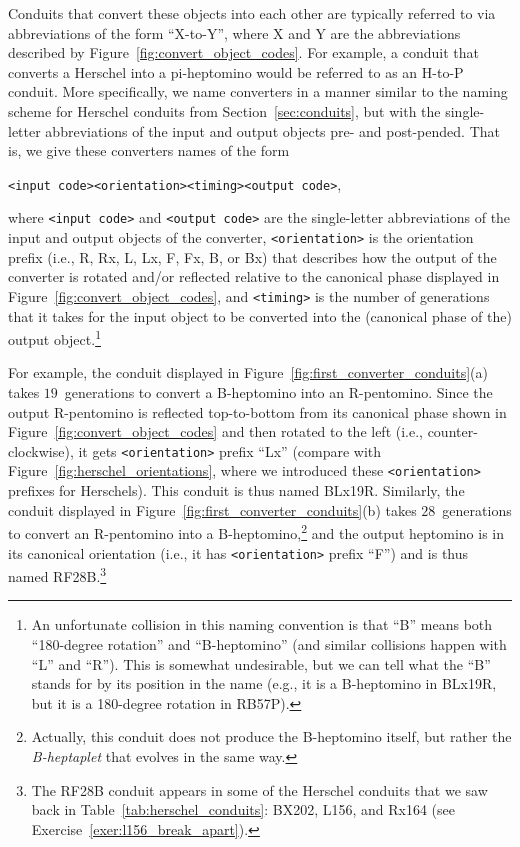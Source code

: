 Conduits that convert these objects into each other are typically referred to via abbreviations of the form ``X-to-Y'', where X and Y are the abbreviations described by Figure~\ref{fig:convert_object_codes}. For example, a conduit that converts a Herschel into a pi-heptomino would be referred to as an H-to-P conduit. More specifically, we name converters in a manner similar to the naming scheme for Herschel conduits from Section~\ref{sec:conduits}, but with the single-letter abbreviations of the input and output objects pre- and post-pended. That is, we give these converters names of the form
\begin{center}
	\verb|<input code><orientation><timing><output code>|,
\end{center}
\noindent where \verb|<input code>| and \verb|<output code>| are the single-letter abbreviations of the input and output objects of the converter, \verb|<orientation>| is the orientation prefix (i.e., R, Rx, L, Lx, F, Fx, B, or Bx) that describes how the output of the converter is rotated and/or reflected relative to the canonical phase displayed in Figure~\ref{fig:convert_object_codes}, and \verb|<timing>| is the number of generations that it takes for the input object to be converted into the (canonical phase of the) output object.\footnote{An unfortunate collision in this naming convention is that ``B'' means both ``180-degree rotation'' and ``B-heptomino'' (and similar collisions happen with ``L'' and ``R''). This is somewhat undesirable, but we can tell what the ``B'' stands for by its position in the name (e.g., it is a B-heptomino in BLx19R, but it is a 180-degree rotation in RB57P).}

For example, the conduit displayed in Figure~\ref{fig:first_converter_conduits}(a) takes $19$~generations to convert a B-heptomino into an R-pentomino. Since the output R-pentomino is reflected top-to-bottom from its canonical phase shown in Figure~\ref{fig:convert_object_codes} and then rotated to the left (i.e., counter-clockwise), it gets \verb|<orientation>| prefix ``Lx'' (compare with Figure~\ref{fig:herschel_orientations}, where we introduced these \verb|<orientation>| prefixes for Herschels). This conduit is thus named BLx19R. Similarly, the conduit displayed in Figure~\ref{fig:first_converter_conduits}(b) takes $28$~generations to convert an R-pentomino into a B-heptomino,\footnote{Actually, this conduit does not produce the B-heptomino itself, but rather the \emph{B-heptaplet} that evolves in the same way.} and the output heptomino is in its canonical orientation (i.e., it has \verb|<orientation>| prefix ``F'') and is thus named RF28B.\footnote{The RF28B conduit appears in some of the Herschel conduits that we saw back in Table~\ref{tab:herschel_conduits}: BX202, L156, and Rx164 (see Exercise~\ref{exer:l156_break_apart}).}

